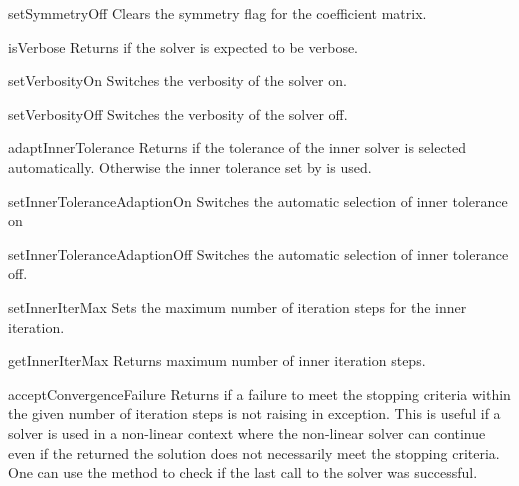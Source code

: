 \begin{methoddesc}[SolverOptions]{setSymmetryOff}{}
Clears the symmetry flag for the coefficient matrix.
\end{methoddesc}

\begin{methoddesc}[SolverOptions]{isVerbose}{}
 Returns \True if the solver is expected to be verbose.
\end{methoddesc}


\begin{methoddesc}[SolverOptions]{setVerbosityOn}{}
Switches the verbosity of the solver on.
\end{methoddesc}


\begin{methoddesc}[SolverOptions]{setVerbosityOff}{}
Switches the verbosity of the solver off.
\end{methoddesc}


\begin{methoddesc}[SolverOptions]{adaptInnerTolerance}{}
Returns \True if the tolerance of the inner solver is selected automatically. 
Otherwise the inner tolerance set by  is used.
\end{methoddesc}

\begin{methoddesc}[SolverOptions]{setInnerToleranceAdaptionOn}{}
Switches the automatic selection of inner tolerance on 
\end{methoddesc}

\begin{methoddesc}[SolverOptions]{setInnerToleranceAdaptionOff}{}
Switches the automatic selection of inner tolerance off.
\end{methoddesc}

\begin{methoddesc}[SolverOptions]{setInnerIterMax}{}
Sets the maximum number of iteration steps for the inner iteration.
\end{methoddesc}

\begin{methoddesc}[SolverOptions]{getInnerIterMax}{}
Returns maximum number of inner iteration steps.
\end{methoddesc}

\begin{methoddesc}[SolverOptions]{acceptConvergenceFailure}{}
Returns \True if a failure to meet the stopping criteria within the
given number of iteration steps is not raising in exception. This is useful 
if a solver is used in a non-linear context where the non-linear solver can 
continue even if the returned the solution does not necessarily meet the
stopping criteria. One can use the  method to check if the
last call to the solver was successful.
\end{methoddesc}

